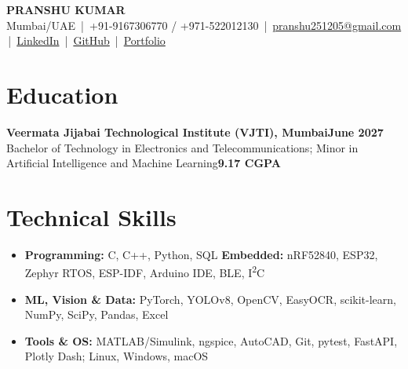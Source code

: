 \documentclass[10pt,letterpaper]{article}
\newcommand{\lnk}[2]{\href{#1}{\textcolor{linkblue}{#2}}}
\begin{document}
\begin{center}
{\large\textbf{PRANSHU KUMAR}}\\[1pt]
Mumbai/UAE \,|\, +91-9167306770 / +971-522012130 \,|\, \lnk{mailto:pranshu251205@gmail.com}{pranshu251205@gmail.com} \,|\, \lnk{https://www.linkedin.com/in/notpranshu/}{LinkedIn} \,|\, \lnk{https://github.com/sudo-pranshu}{GitHub} \,|\, \lnk{https://portfoliopranshukumar.vercel.app}{Portfolio}
\end{center}
\vspace{-8pt}

\section{Education}
\textbf{Veermata Jijabai Technological Institute (VJTI), Mumbai}\hfill\textbf{June 2027}\\
Bachelor of Technology in Electronics and Telecommunications; Minor in Artificial Intelligence and Machine Learning\hfill\textbf{9.17 CGPA}

\section{Technical Skills}
\begin{itemize}
\item \textbf{Programming:} C, C++, Python, SQL \quad \textbf{Embedded:} nRF52840, ESP32, Zephyr RTOS, ESP-IDF, Arduino IDE, BLE, I\textsuperscript{2}C
\item \textbf{ML, Vision \& Data:} PyTorch, YOLOv8, OpenCV, EasyOCR, scikit-learn, NumPy, SciPy, Pandas, Excel
\item \textbf{Tools \& OS:} MATLAB/Simulink, ngspice, AutoCAD, Git, pytest, FastAPI, Plotly Dash; Linux, Windows, macOS
\end{itemize}
\end{document}
